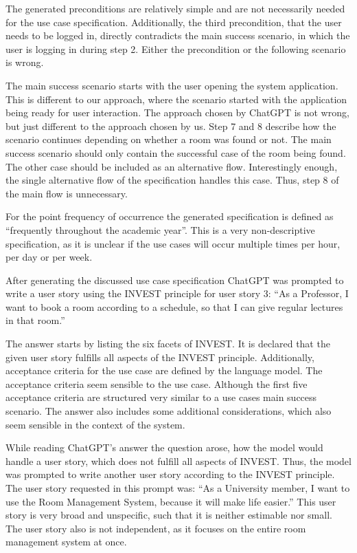 \documentclass[article,onecolumn]{IEEEtran}
\begin{document}
The generated preconditions are relatively simple and are not necessarily needed for the use case specification. Additionally, the third precondition, that the user needs to be logged in, directly contradicts the main success scenario, in which the user is logging in during step 2. Either the precondition or the following scenario is wrong.

The main success scenario starts with the user opening the system application. This is different to our approach, where the scenario started with the application being ready for user interaction. The approach chosen by ChatGPT is not wrong, but just different to the approach chosen by us.
Step 7 and 8 describe how the scenario continues depending on whether a room was found or not. The main success scenario should only contain the successful case of the room being found. The other case should be included as an alternative flow.
Interestingly enough, the single alternative flow of the specification handles this case. Thus, step 8 of the main flow is unnecessary.

For the point frequency of occurrence the generated specification is defined as ``frequently throughout the academic year''. This is a very non-descriptive specification, as it is unclear if the use cases will occur multiple times per hour, per day or per week.


After generating the discussed use case specification ChatGPT was prompted to write a user story using the INVEST principle for user story 3: ``As a Professor, I want to book a room according to a schedule, so that I can give regular lectures in that room.''

The answer starts by listing the six facets of INVEST. It is declared that the given user story fulfills all aspects of the INVEST principle.
Additionally, acceptance criteria for the use case are defined by the language model. The acceptance criteria seem sensible to the use case. Although the first five acceptance criteria are structured very similar to a use cases main success scenario.
The answer also includes some additional considerations, which also seem sensible in the context of the system.

While reading ChatGPT's answer the question arose, how the model would handle a user story, which does not fulfill all aspects of INVEST.
Thus, the model was prompted to write another user story according to the INVEST principle. The user story requested in this prompt was: ``As a University member, I want to use the Room Management System, because it will make life easier.''
This user story is very broad and unspecific, such that it is neither estimable nor small. The user story also is not independent, as it focuses on the entire room management system at once.
\end{document}
